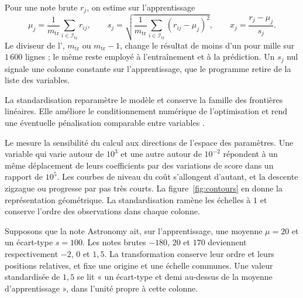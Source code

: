 Pour une note brute $r_j$, on estime sur l'apprentissage
\[
  \mu_j=\frac1{m_{\mathrm{tr}}}\sum_{i\in\mathcal I_{\mathrm{tr}}}r_{ij},
  \qquad
  s_j=\sqrt{\frac1{m_{\mathrm{tr}}}\sum_{i\in\mathcal I_{\mathrm{tr}}}
    (r_{ij}-\mu_j)^2},
  \qquad x_j=\frac{r_j-\mu_j}{s_j}.
\]
Le diviseur de l', $m_{\mathrm{tr}}$ ou
$m_{\mathrm{tr}}-1$, change le résultat de moins
d'un pour mille sur $1\,600$ lignes ; le même reste employé à l'entraînement et à
la prédiction. Un $s_j$ nul signale une colonne constante sur l'apprentissage,
que le programme retire de la liste des variables.

La standardisation reparamètre le modèle et conserve la famille des frontières
linéaires. Elle améliore le conditionnement numérique de l'optimisation et rend
une éventuelle pénalisation comparable entre variables
\cite[sec.~4.6.3]{hastie2009}.

Le  mesure la sensibilité du calcul aux directions de
l'espace des paramètres. Une variable qui varie autour de $10^3$ et une autre
autour de $10^{-2}$ répondent à un même déplacement de leurs coefficients par des
variations de score dans un rapport de $10^5$. Les courbes de niveau du coût
s'allongent d'autant, et la descente zigzague ou progresse par pas très courts.
La figure~\ref{fig:contours} en donne la représentation géométrique. La
standardisation ramène les échelles à $1$ et conserve l'ordre des observations
dans chaque colonne.

\begin{resultat}
Supposons que la note Astronomy ait, sur l'apprentissage, une moyenne
$\mu=20$ et un écart-type $s=100$. Les notes brutes $-180$, $20$ et $170$
deviennent respectivement $-2$, $0$ et $1{,}5$. La transformation conserve leur
ordre et leurs positions relatives, et fixe une origine et une échelle communes.
Une valeur standardisée de $1{,}5$ se lit « un écart-type et demi au-dessus de la
moyenne d'apprentissage », dans l'unité propre à cette colonne.
\end{resultat}

